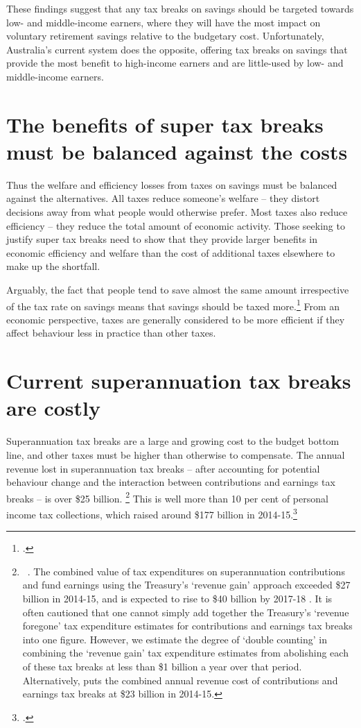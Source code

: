 \documentclass{grattanAlpha}
\begin{document}
These findings suggest that any tax breaks on savings should be targeted towards low- and middle-income earners, where they will have the most impact on voluntary retirement savings relative to the budgetary cost. Unfortunately, Australia’s current system does the opposite, offering tax breaks on savings that provide the most benefit to high-income earners and are little-used by low- and middle-income earners. 

\section{The benefits of super tax breaks must be balanced against the costs}\label{sec:SUPER-2-7}
Thus the welfare and efficiency losses from taxes on savings must be balanced against the alternatives. All taxes reduce someone’s welfare – they distort decisions away from what people would otherwise prefer. Most taxes also reduce efficiency – they reduce the total amount of economic activity. Those seeking to justify super tax breaks need to show that they provide larger benefits in economic efficiency and welfare than the cost of additional taxes elsewhere to make up the shortfall.

Arguably, the fact that people tend to save almost the same amount irrespective of the tax rate on savings means that savings should be taxed more.\footcite[][21]{Ingles2015}  From an economic perspective, taxes are generally considered to be more efficient if they affect behaviour less in practice than other taxes.

\section{Current superannuation tax breaks are costly}\label{sec:SUPER-2-8}
Superannuation tax breaks are a large and growing cost to the budget bottom line, and other taxes must be higher than otherwise to compensate. The annual revenue lost in superannuation tax breaks – after accounting for potential behaviour change and the interaction between contributions and earnings tax breaks – is over \$25 billion.%
\footnote{\label{fn:81}\gao\ \textcites{APRA2014}{APRA2015JuneSuperPerformance}{Treasury2015TES2014}. The combined value of tax expenditures on superannuation contributions and fund earnings using the Treasury’s ‘revenue gain’ approach exceeded \$27 billion in 2014-15, and is expected to rise to \$40 billion by 2017-18 \textcite{Treasury2015TES2014}. It is often cautioned that one cannot simply add together the Treasury’s ‘revenue foregone’ tax expenditure estimates for contributions and earnings tax breaks into one figure. However, we estimate the degree of ‘double counting’ in combining the ‘revenue gain’ tax expenditure estimates from abolishing each of these tax breaks at less than \$1 billion a year over that period. Alternatively, \textcite[][28]{ASFA2015TreasurySubmission} puts the combined annual revenue cost of contributions and earnings tax breaks at \$23 billion in 2014-15.} 
This is well more than 10 per cent of personal income tax collections, which raised around \$177 billion in 2014-15.\footcite[][4--14]{Treasury2015BudgetPapers201516}
\end{document}
